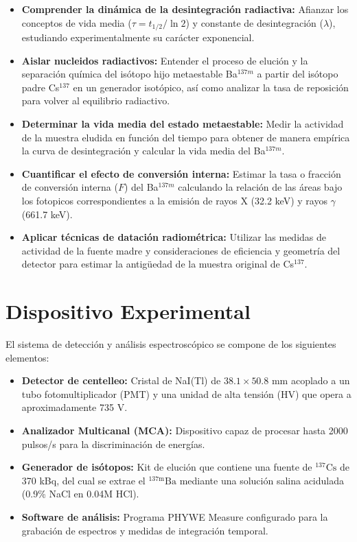 \documentclass[9pt,a4paper,twocolumn,twoside]{rho-class/rho}
\begin{document}
\begin{itemize}
    \item \textbf{Comprender la dinámica de la desintegración radiactiva:} Afianzar los conceptos de vida media ($\tau = t_{1/2}/\ln 2$) y constante de desintegración ($\lambda$), estudiando experimentalmente su carácter exponencial.
    \item \textbf{Aislar nucleidos radiactivos:} Entender el proceso de elución y la separación química del isótopo hijo metaestable Ba$^{137m}$ a partir del isótopo padre Cs$^{137}$ en un generador isotópico, así como analizar la tasa de reposición para volver al equilibrio radiactivo.
    \item \textbf{Determinar la vida media del estado metaestable:} Medir la actividad de la muestra eludida en función del tiempo para obtener de manera empírica la curva de desintegración y calcular la vida media del Ba$^{137m}$.
    \item \textbf{Cuantificar el efecto de conversión interna:} Estimar la tasa o fracción de conversión interna ($F$) del Ba$^{137m}$ calculando la relación de las áreas bajo los fotopicos correspondientes a la emisión de rayos X (32.2 keV) y rayos $\gamma$ (661.7 keV).
    \item \textbf{Aplicar técnicas de datación radiométrica:} Utilizar las medidas de actividad de la fuente madre y consideraciones de eficiencia y geometría del detector para estimar la antigüedad de la muestra original de Cs$^{137}$.
\end{itemize}

\section{Dispositivo Experimental}

El sistema de detección y análisis espectroscópico se compone de los siguientes elementos: %

\begin{itemize}
    \item \textbf{Detector de centelleo:} Cristal de NaI(Tl) de $38.1 \times 50.8$ mm acoplado a un tubo fotomultiplicador (PMT) y una unidad de alta tensión (HV) que opera a aproximadamente 735 V. %
    \item \textbf{Analizador Multicanal (MCA):} Dispositivo capaz de procesar hasta 2000 pulsos/s para la discriminación de energías. %
    \item \textbf{Generador de isótopos:} Kit de elución que contiene una fuente de $^{137}\text{Cs}$ de 370 kBq, del cual se extrae el $^{137\text{m}}\text{Ba}$ mediante una solución salina acidulada (0.9\% NaCl en 0.04M HCl). %
    \item \textbf{Software de análisis:} Programa PHYWE Measure configurado para la grabación de espectros y medidas de integración temporal. %
\end{itemize}
\end{document}
